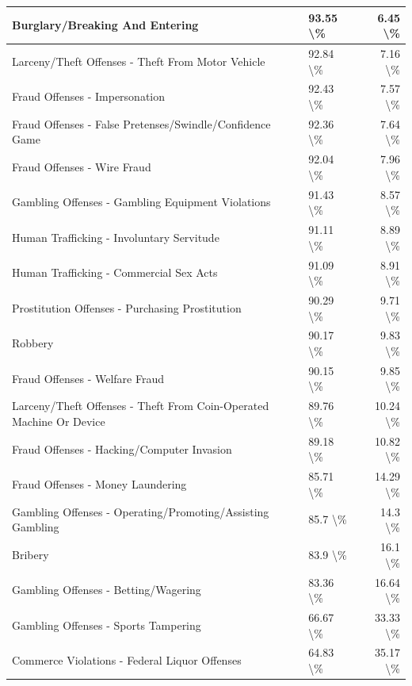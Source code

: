 \documentclass[
]{krantz}
\begin{document}
\begin{longtable}[t]{l|l|r}
\hline
Burglary/Breaking And Entering & 93.55 \textbackslash{}\% & 6.45 \textbackslash{}\%\\
\hline
Larceny/Theft Offenses - Theft From Motor Vehicle & 92.84 \textbackslash{}\% & 7.16 \textbackslash{}\%\\
\hline
Fraud Offenses - Impersonation & 92.43 \textbackslash{}\% & 7.57 \textbackslash{}\%\\
\hline
Fraud Offenses - False Pretenses/Swindle/Confidence Game & 92.36 \textbackslash{}\% & 7.64 \textbackslash{}\%\\
\hline
Fraud Offenses - Wire Fraud & 92.04 \textbackslash{}\% & 7.96 \textbackslash{}\%\\
\hline
Gambling Offenses - Gambling Equipment Violations & 91.43 \textbackslash{}\% & 8.57 \textbackslash{}\%\\
\hline
Human Trafficking - Involuntary Servitude & 91.11 \textbackslash{}\% & 8.89 \textbackslash{}\%\\
\hline
Human Trafficking - Commercial Sex Acts & 91.09 \textbackslash{}\% & 8.91 \textbackslash{}\%\\
\hline
Prostitution Offenses - Purchasing Prostitution & 90.29 \textbackslash{}\% & 9.71 \textbackslash{}\%\\
\hline
Robbery & 90.17 \textbackslash{}\% & 9.83 \textbackslash{}\%\\
\hline
Fraud Offenses - Welfare Fraud & 90.15 \textbackslash{}\% & 9.85 \textbackslash{}\%\\
\hline
Larceny/Theft Offenses - Theft From Coin-Operated Machine Or Device & 89.76 \textbackslash{}\% & 10.24 \textbackslash{}\%\\
\hline
Fraud Offenses - Hacking/Computer Invasion & 89.18 \textbackslash{}\% & 10.82 \textbackslash{}\%\\
\hline
Fraud Offenses - Money Laundering & 85.71 \textbackslash{}\% & 14.29 \textbackslash{}\%\\
\hline
Gambling Offenses - Operating/Promoting/Assisting Gambling & 85.7 \textbackslash{}\% & 14.3 \textbackslash{}\%\\
\hline
Bribery & 83.9 \textbackslash{}\% & 16.1 \textbackslash{}\%\\
\hline
Gambling Offenses - Betting/Wagering & 83.36 \textbackslash{}\% & 16.64 \textbackslash{}\%\\
\hline
Gambling Offenses - Sports Tampering & 66.67 \textbackslash{}\% & 33.33 \textbackslash{}\%\\
\hline
Commerce Violations - Federal Liquor Offenses & 64.83 \textbackslash{}\% & 35.17 \textbackslash{}\%\\

\end{longtable}
\end{document}
